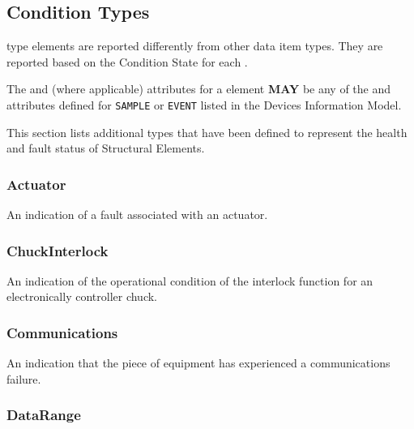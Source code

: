 \subsection{Condition Types} \label{sec:Condition Types}


 type elements are reported differently from other data item types. They are reported based on the \gls{Condition State} for each .

The  and  (where applicable) attributes for a  element \textbf{MAY} be any of the  and  attributes defined for \texttt{SAMPLE}  or \texttt{EVENT}   listed in the \gls{Devices Information Model}.

This section lists additional  types that have been defined to represent the health and fault status of \glspl{Structural Element}.


\subsubsection{Actuator}
\label{sec:Actuator}



An indication of a fault associated with an actuator.



\subsubsection{ChuckInterlock}
\label{sec:ChuckInterlock}



An indication of the operational condition of the interlock function for an electronically controller chuck.



\subsubsection{Communications}
\label{sec:Communications}



An indication that the piece of equipment has experienced a communications failure.



\subsubsection{DataRange}
\label{sec:DataRange}



